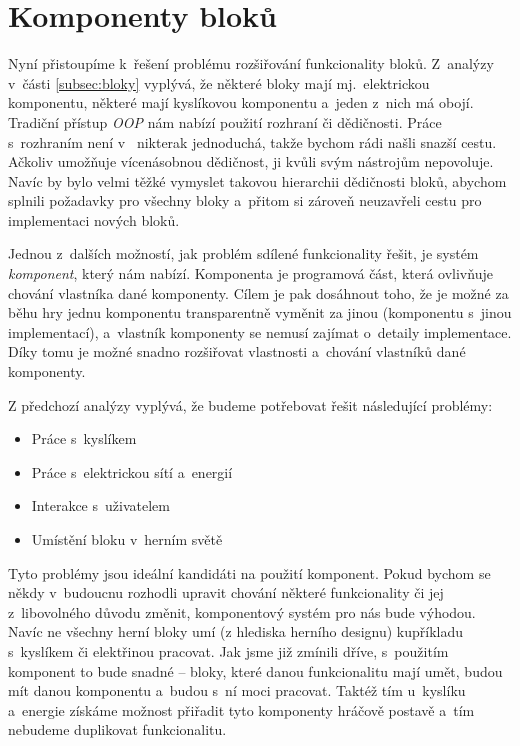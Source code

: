 


\section{Komponenty bloků}
\label{sec:komponents}

Nyní přistoupíme k~řešení problému rozšiřování funkcionality bloků. Z~analýzy v~části \ref{subsec:bloky} vyplývá, že některé bloky mají mj.~elektrickou komponentu, některé mají kyslíkovou komponentu a~jeden z~nich má obojí. Tradiční přístup \textit{OOP} nám nabízí použití rozhraní či dědičnosti. Práce s~rozhraním není v~\UEu{} nikterak jednoduchá, takže bychom rádi našli snazší cestu. Ačkoliv \CPP{} umožňuje vícenásobnou dědičnost, \UE{} ji kvůli svým nástrojům nepovoluje. Navíc by bylo velmi těžké vymyslet takovou hierarchii dědičnosti bloků, abychom splnili požadavky pro všechny bloky a~přitom si zároveň neuzavřeli cestu pro implementaci nových bloků. 

Jednou z~dalších možností, jak problém sdílené funkcionality řešit, je systém \textit{komponent}, který nám \UE{} nabízí. Komponenta je programová část, která ovlivňuje chování vlastníka dané komponenty. Cílem je pak dosáhnout toho, že je možné za běhu hry jednu komponentu transparentně vyměnit za jinou (komponentu s~jinou implementací), a~vlastník komponenty se nemusí zajímat o~detaily implementace. Díky tomu je možné snadno rozšiřovat vlastnosti a~chování vlastníků dané komponenty.

Z předchozí analýzy vyplývá, že budeme potřebovat řešit následující problémy:

\begin{itemize}
	\item Práce s~kyslíkem
	\item Práce s~elektrickou sítí a~energií
	\item Interakce s~uživatelem
	\item Umístění bloku v~herním světě
\end{itemize}


Tyto problémy jsou ideální kandidáti na použití komponent. Pokud bychom se někdy v~budoucnu rozhodli upravit chování některé funkcionality či jej z~libovolného důvodu změnit, komponentový systém pro nás bude výhodou. Navíc ne všechny herní bloky umí (z hlediska herního designu) kupříkladu s~kyslíkem či elektřinou pracovat. Jak jsme již zmínili dříve,  s~použitím komponent to bude snadné -- bloky, které danou funkcionalitu mají umět, budou mít danou komponentu a~budou s~ní moci pracovat. Taktéž tím u~kyslíku a~energie získáme možnost přiřadit tyto komponenty hráčově postavě a~tím nebudeme duplikovat funkcionalitu.

